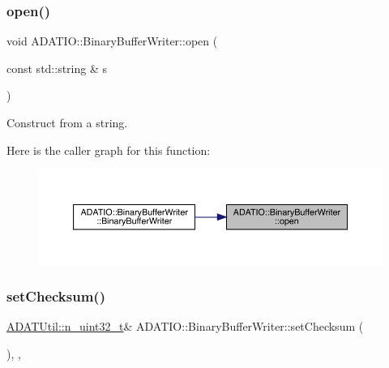 \subsubsection{\texorpdfstring{open()}{open()}\hspace{0.1cm}{\footnotesize\ttfamily [3/3]}}
{\footnotesize\ttfamily void A\+D\+A\+T\+I\+O\+::\+Binary\+Buffer\+Writer\+::open (\begin{DoxyParamCaption}\item[{const std\+::string \&}]{s }\end{DoxyParamCaption})}



Construct from a string. 

Here is the caller graph for this function\+:
\nopagebreak
\begin{figure}[H]
\begin{center}
\leavevmode
\includegraphics[width=350pt]{d8/d90/classADATIO_1_1BinaryBufferWriter_a394d7bf949c4def18697af392fb217a5_icgraph}
\end{center}
\end{figure}
\mbox{\label{classADATIO_1_1BinaryBufferWriter_af4cc523a862ce29a96f1a813f254360e}} 
\subsubsection{\texorpdfstring{setChecksum()}{setChecksum()}\hspace{0.1cm}{\footnotesize\ttfamily [1/3]}}
{\footnotesize\ttfamily \mbox{\hyperlink{namespaceADATUtil_ad945a8afa4db2d1f89b731964adae97e}{A\+D\+A\+T\+Util\+::n\+\_\+uint32\+\_\+t}}\& A\+D\+A\+T\+I\+O\+::\+Binary\+Buffer\+Writer\+::set\+Checksum (\begin{DoxyParamCaption}{ }\end{DoxyParamCaption})\hspace{0.3cm}{\ttfamily [inline]}, {\ttfamily [protected]}, {\ttfamily [virtual]}}



